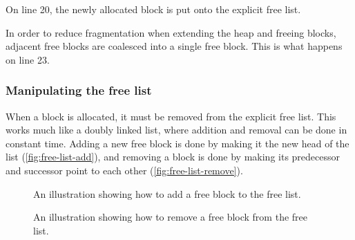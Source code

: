 On line 20, the newly allocated block is put onto the explicit free list.

In order to reduce fragmentation when extending the heap and freeing blocks, adjacent free blocks are coalesced into a single free block. This is what happens on line 23.

\subsubsection{Manipulating the free list}
\label{sec:manipulate-free-list}

When a block is allocated, it must be removed from the explicit free list. This works much like a doubly linked list, where addition and removal can be done in constant time. Adding a new free block is done by making it the new head of the list (\autoref{fig:free-list-add}), and removing a block is done by making its predecessor and successor point to each other (\autoref{fig:free-list-remove}).

\begin{figure}[H]
  \centering
  \hbox{}
  \caption{An illustration showing how to add a free block to the free list.}
  \label{fig:free-list-add}
\end{figure}

\begin{figure}[H]
  \centering
  \hbox{}
  \caption{An illustration showing how to remove a free block from the free list.}
  \label{fig:free-list-remove}
\end{figure}

